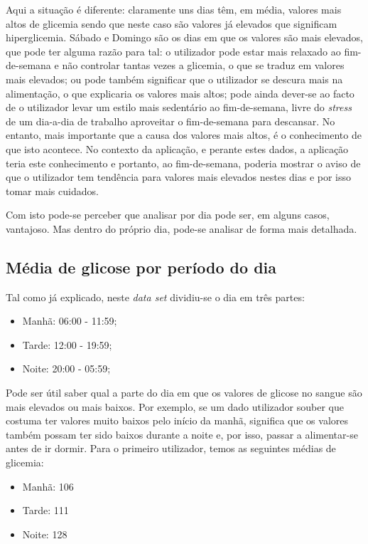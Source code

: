Aqui a situação é diferente: claramente uns dias têm, em média, valores mais altos de glicemia sendo que neste caso são valores já elevados que significam hiperglicemia. Sábado e Domingo são os dias em que os valores são mais elevados, que pode ter alguma razão para tal: o utilizador pode estar mais relaxado ao fim-de-semana e não controlar tantas vezes a glicemia, o que se traduz em valores mais elevados; ou pode também significar que o utilizador se descura mais na alimentação, o que explicaria os valores mais altos; pode ainda dever-se ao facto de o utilizador levar um estilo mais sedentário ao fim-de-semana, livre do \textit{stress} de um dia-a-dia de trabalho aproveitar o fim-de-semana para descansar. No entanto, mais importante que a causa dos valores mais altos, é o conhecimento de que isto acontece. No contexto da aplicação, e perante estes dados, a aplicação teria este conhecimento e portanto, ao fim-de-semana, poderia mostrar o aviso de que o utilizador tem tendência para valores mais elevados nestes dias e por isso tomar mais cuidados. 

Com isto pode-se perceber que analisar por dia pode ser, em alguns casos, vantajoso. Mas dentro do próprio dia, pode-se analisar de forma mais detalhada.

\subsection{Média de glicose por período do dia}

Tal como já explicado, neste \textit{data set} dividiu-se o dia em três partes:

\begin{itemize}
\item Manhã: 06:00 - 11:59;
\item Tarde: 12:00 - 19:59;
\item Noite: 20:00 - 05:59;
\end{itemize}

Pode ser útil saber qual a parte do dia em que os valores de glicose no sangue são mais elevados ou mais baixos. Por exemplo, se um dado utilizador souber que costuma ter valores muito baixos pelo início da manhã, significa que os valores também possam ter sido baixos durante a noite e, por isso, passar a alimentar-se antes de ir dormir. Para o primeiro utilizador, temos as seguintes médias de glicemia:

\begin{itemize}
\item Manhã: 106
\item Tarde: 111
\item Noite: 128
\end{itemize}

